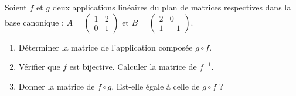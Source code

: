 \documentclass[11pt]{article}
\begin{document}
\begin{exercice}
Soient $f$ et $g$ deux applications linéaires du plan de matrices respectives dans la base canonique :
$A = \begin{pmatrix} 1 & 2 \\ 0 & 1 \end{pmatrix}$ et $B = \begin{pmatrix} 2 & 0 \\ 1 & -1 \end{pmatrix}$.
\begin{enumerate}
    \item Déterminer la matrice de l'application composée $g \circ f$.
    \item Vérifier que $f$ est bijective. Calculer la matrice de $f^{-1}$.
    \item Donner la matrice de $f \circ g$. Est-elle égale à celle de $g \circ f$ ?
\end{enumerate}
\end{exercice}
\end{document}

